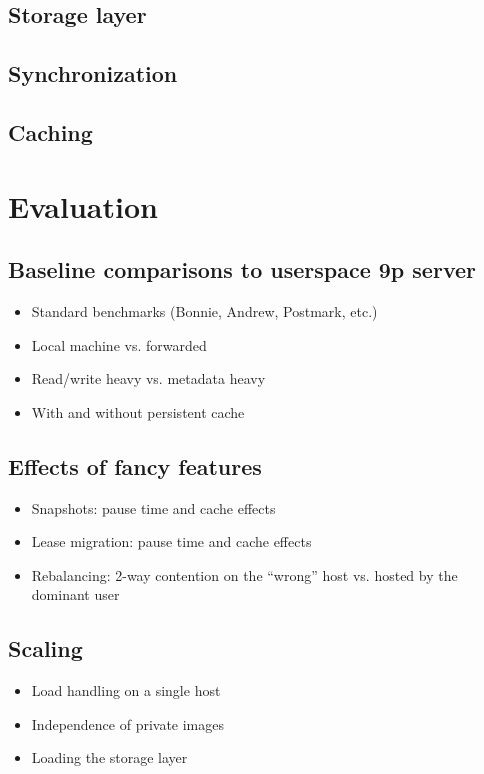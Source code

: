 \documentclass[a4paper,12pt]{article}
\begin{document}
\subsection{Storage layer}
\subsection{Synchronization}
\subsection{Caching}

\section{Evaluation}

\subsection{Baseline comparisons to userspace 9p server}
\begin{itemize}
\item Standard benchmarks (Bonnie, Andrew, Postmark, etc.)
\item Local machine vs. forwarded
\item Read/write heavy vs. metadata heavy
\item With and without persistent cache
\end{itemize}
\subsection{Effects of fancy features}
\begin{itemize}
\item Snapshots: pause time and cache effects
\item Lease migration: pause time and cache effects
\item Rebalancing: 2-way contention on the ``wrong'' host vs. hosted by the dominant user
\end{itemize}
\subsection{Scaling}
\begin{itemize}
\item Load handling on a single host
\item Independence of private images
\item Loading the storage layer
\end{itemize}
\end{document}
